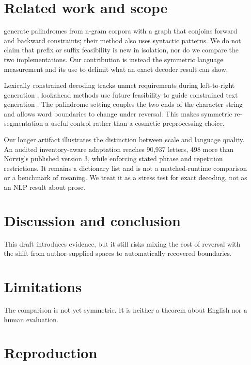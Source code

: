 \documentclass[11pt]{article}
\begin{document}
\section{Related work and scope}

\citet{papadopoulos2015palindromes} generate palindromes from n-gram corpora
with a graph that conjoins forward and backward constraints; their method also
uses syntactic patterns. We do not claim that prefix or suffix feasibility is
new in isolation, nor do we compare the two implementations. Our contribution
is instead the symmetric language measurement and its use to delimit what an
exact decoder result can show.

Lexically constrained decoding tracks unmet requirements during left-to-right
generation \citep{hokamp2017grid,post2018fast}; lookahead methods use future
feasibility to guide constrained text generation \citep{lu2022astar}. The
palindrome setting couples the two ends of the character string and allows word
boundaries to change under reversal. This makes symmetric re-segmentation a
useful control rather than a cosmetic preprocessing choice.

Our longer artifact illustrates the distinction between scale and language
quality. An audited inventory-aware adaptation reaches 90,937 letters, 498
more than Norvig's published version 3, while enforcing stated phrase and
repetition restrictions. It remains a dictionary list and is not a
matched-runtime comparison or a benchmark of meaning. We treat it as a stress
test for exact decoding, not as an NLP result about prose.

\section{Discussion and conclusion}

This draft introduces evidence, but it still risks mixing the cost of reversal with the shift from author-supplied spaces to automatically recovered boundaries.

\section*{Limitations}

The comparison is not yet symmetric. It is neither a theorem about English nor a human evaluation.



\appendix
\section{Reproduction}
\end{document}

